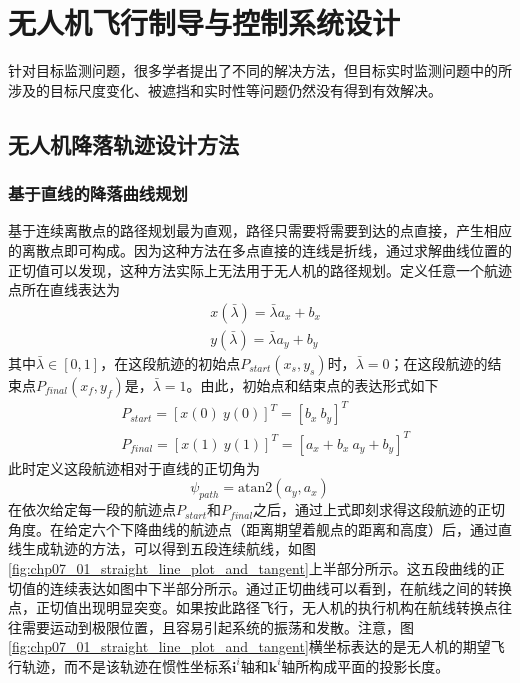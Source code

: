 \chapter{无人机飞行制导与控制系统设计}
针对目标监测问题，很多学者提出了不同的解决方法，但目标实时监测问题中的所涉及的目标尺度变化、被遮挡和实时性等问题仍然没有得到有效解决。
 
\section{无人机降落轨迹设计方法}

\subsection{基于直线的降落曲线规划}
基于连续离散点的路径规划最为直观，路径只需要将需要到达的点直接，产生相应的离散点即可构成。因为这种方法在多点直接的连线是折线，通过求解曲线位置的正切值可以发现，这种方法实际上无法用于无人机的路径规划。定义任意一个航迹点所在直线表达为
\begin{align}
&x(\bar{\lambda}) =\bar{\lambda} a_x + b_x \\
&y(\bar{\lambda}) =  \bar{\lambda} a_y +b_y
\end{align}
其中$\bar{\lambda} \in [0, 1]$，在这段航迹的初始点$P_{start}(x_s, y_s)$时，$\bar{\lambda} = 0$；在这段航迹的结束点$P_{final}(x_f,y_f)$是，$\bar{\lambda} = 1$。由此，初始点和结束点的表达形式如下
\begin{align}
&P_{start} = [x(0)\ y(0)]^T=[b_x\ b_y]^T \\
&P_{final} = [x(1)\ y(1)]^T=[a_x+b_x\ a_y+b_y]^T
\end{align}
此时定义这段航迹相对于直线的正切角为
\begin{equation}
\psi_{path}=\text{atan2}(a_y, a_x)
\end{equation}
在依次给定每一段的航迹点$P_{start}$和$P_{final}$之后，通过上式即刻求得这段航迹的正切角度。在给定六个下降曲线的航迹点（距离期望着舰点的距离和高度）后，通过直线生成轨迹的方法，可以得到五段连续航线，如图\ref{fig:chp07_01_straight_line_plot_and_tangent}上半部分所示。这五段曲线的正切值的连续表达如图中下半部分所示。通过正切曲线可以看到，在航线之间的转换点，正切值出现明显突变。如果按此路径飞行，无人机的执行机构在航线转换点往往需要运动到极限位置，且容易引起系统的振荡和发散。注意，图\ref{fig:chp07_01_straight_line_plot_and_tangent}横坐标表达的是无人机的期望飞行轨迹，而不是该轨迹在惯性坐标系$\mathbf{i}^{i}$轴和$\mathbf{k}^{i}$轴所构成平面的投影长度。

